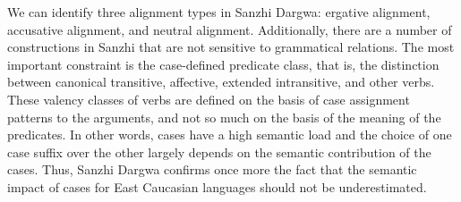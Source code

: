 We can identify three alignment types in Sanzhi Dargwa: ergative alignment, accusative alignment, and neutral alignment. Additionally, there are a number of constructions in Sanzhi that are not sensitive to grammatical relations. The most important constraint is the case-defined predicate class, that is, the distinction between canonical transitive, affective, extended intransitive, and other verbs. These valency classes of verbs are defined on the basis of case assignment patterns to the arguments, and not so much on the basis of the meaning of the predicates. In other words, cases have a high semantic load and the choice of one case suffix over the other largely depends on the semantic contribution of the cases. Thus, Sanzhi Dargwa confirms once more the fact that the semantic impact of cases for East Caucasian languages should not be underestimated.


